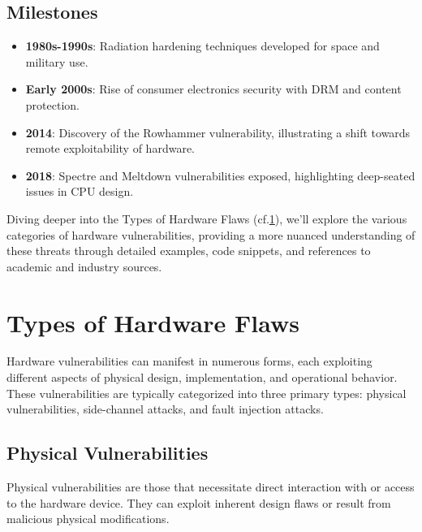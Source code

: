 \hypertarget{milestones}{%
\subsection{Milestones}\label{milestones}}

\begin{itemize}
\item
  \textbf{1980s-1990s}: Radiation hardening techniques developed for
  space and military use.
\item
  \textbf{Early 2000s}: Rise of consumer electronics security with DRM
  and content protection.
\item
  \textbf{2014}: Discovery of the Rowhammer vulnerability, illustrating
  a shift towards remote exploitability of hardware.
\item
  \textbf{2018}: Spectre and Meltdown vulnerabilities exposed,
  highlighting deep-seated issues in CPU design.
\end{itemize}

Diving deeper into the Types of Hardware Flaws (cf.\ref{types-of-hardware-flaws}), we'll
explore the various categories of hardware vulnerabilities, providing a
more nuanced understanding of these threats through detailed examples,
code snippets, and references to academic and industry sources.

\hypertarget{types-of-hardware-flaws}{%
\section{Types of Hardware Flaws}\label{types-of-hardware-flaws}}

Hardware vulnerabilities can manifest in numerous forms, each exploiting
different aspects of physical design, implementation, and operational
behavior. These vulnerabilities are typically categorized into three
primary types: physical vulnerabilities, side-channel attacks, and fault
injection attacks.

\hypertarget{physical-vulnerabilities}{%
\subsection{Physical
Vulnerabilities}\label{physical-vulnerabilities}}

Physical vulnerabilities are those that necessitate direct interaction
with or access to the hardware device. They can exploit inherent design
flaws or result from malicious physical modifications.

